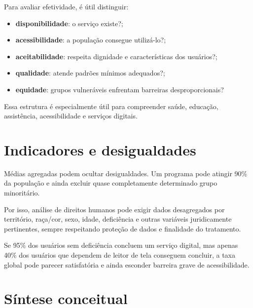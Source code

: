 Para avaliar efetividade, é útil distinguir:
\begin{itemize}
\item \textbf{disponibilidade}: o serviço existe?;
\item \textbf{acessibilidade}: a população consegue utilizá-lo?;
\item \textbf{aceitabilidade}: respeita dignidade e características dos usuários?;
\item \textbf{qualidade}: atende padrões mínimos adequados?;
\item \textbf{equidade}: grupos vulneráveis enfrentam barreiras desproporcionais?
\end{itemize}

Essa estrutura é especialmente útil para compreender saúde, educação, assistência, acessibilidade e serviços digitais.

\section{Indicadores e desigualdades}

Médias agregadas podem ocultar desigualdades. Um programa pode atingir 90\% da população e ainda excluir quase completamente determinado grupo minoritário.

Por isso, análise de direitos humanos pode exigir dados desagregados por território, raça/cor, sexo, idade, deficiência e outras variáveis juridicamente pertinentes, sempre respeitando proteção de dados e finalidade do tratamento.

\begin{exemplo}
Se 95\% dos usuários sem deficiência concluem um serviço digital, mas apenas 40\% dos usuários que dependem de leitor de tela conseguem concluir, a taxa global pode parecer satisfatória e ainda esconder barreira grave de acessibilidade.
\end{exemplo}

\section{Síntese conceitual}

